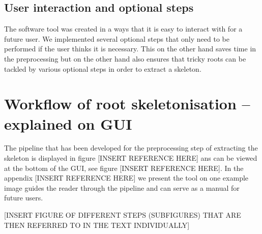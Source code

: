 \subsection{User interaction and optional steps}
The software tool was created in a ways that it is easy to interact with for a future user. 
We implemented several optional steps that only need to be performed if the user thinks it is necessary. This on the other hand saves time in the preprocessing but on the other hand also ensures that tricky roots can be tackled by various optional steps in order to extract a skeleton. 


\section{Workflow of root skeletonisation -- explained on GUI}

The pipeline that has been developed for the preprocessing step of extracting the skeleton is displayed in figure [INSERT REFERENCE HERE] ans can be viewed at the bottom of the GUI, see figure [INSERT REFERENCE HERE].
In the appendix [INSERT REFERENCE HERE] we present the tool on one example image guides the reader through the pipeline and can serve as a manual for future users.

[INSERT FIGURE OF DIFFERENT STEPS (SUBFIGURES) THAT ARE THEN REFERRED TO IN THE TEXT INDIVIDUALLY]


%
%
%
%
%
%
%
%



